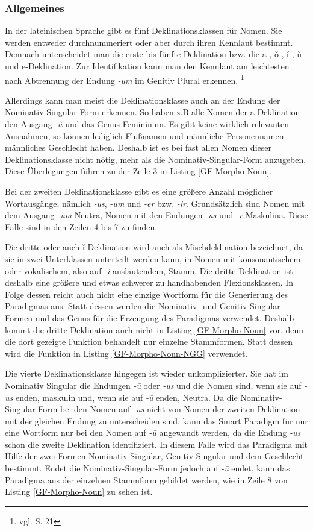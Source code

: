 \subsubsection{Allgemeines}
In der lateinischen Sprache gibt es fünf Deklinationsklassen für Nomen. Sie werden entweder durchnummeriert oder aber durch ihren Kennlaut bestimmt. Demnach unterscheidet man die erste bis fünfte Deklination bzw. die ā-, ǒ-, ǐ-, ǔ- und ē-Deklination. Zur Identifikation kann man den Kennlaut am leichtesten nach Abtrennung der Endung \textit{-um} im Genitiv Plural erkennen. \footnote{vgl. \cite{BAYER-LINDAUER1994} S. 21}\par
Allerdings kann man meist die Deklinationsklasse auch an der Endung der Nominativ-Singular-Form erkennen. So haben z.B alle Nomen der ā-Deklination den Ausgang \textit{-ǎ} und das Genus Femininum. Es gibt keine wirklich relevanten Ausnahmen, so können lediglich Flußnamen und männliche Personennamen männliches Geschlecht haben. Deshalb ist es bei fast allen Nomen dieser Deklinationsklasse nicht nötig, mehr als die Nominativ-Singular-Form anzugeben. Diese Überlegungen führen zu der Zeile 3 in Listing \ref{GF-Morpho-Noun}.\par
Bei der zweiten Deklinationsklasse gibt es eine größere Anzahl möglicher Wortausgänge, nämlich \textit{-us}, \textit{-um} und \textit{-er} bzw. \textit{-ir}. Grundsätzlich sind Nomen mit dem Ausgang \textit{-um} Neutra, Nomen mit den Endungen \textit{-us} und \textit{-r} Maskulina. Diese Fälle sind in den Zeilen 4 bis 7 zu finden. \par
Die dritte oder auch ǐ-Deklination wird auch als Mischdeklination bezeichnet, da sie in zwei Unterklassen unterteilt werden kann, in Nomen mit konsonantischem oder vokalischem, also auf \textit{-ǐ} auslautendem, Stamm. Die dritte Deklination ist deshalb eine größere und etwas schwerer zu handhabenden Flexionsklassen. In Folge dessen reicht auch nicht eine einzige Wortform für die Generierung des Paradigmas aus. Statt dessen werden die Nominativ- und Genitiv-Singular-Formen und das Genus für die Erzeugung des Paradigmas verwendet. Deshalb kommt die dritte Deklination auch nicht in Listing \ref{GF-Morpho-Noun} vor, denn die dort gezeigte Funktion behandelt nur einzelne Stammformen. Statt dessen wird die Funktion in Listing \ref{GF-Morpho-Noun-NGG} verwendet.\par
Die vierte Deklinationsklasse hingegen ist wieder unkomplizierter. Sie hat im Nominativ Singular die Endungen \textit{-ū} oder \textit{-us} und die Nomen sind, wenn sie auf \textit{-us} enden, maskulin und, wenn sie auf \textit{-ū} enden, Neutra. Da die Nominativ-Singular-Form bei den Nomen auf \textit{-us} nicht von Nomen der zweiten Deklination mit der gleichen Endung zu unterscheiden sind, kann das Smart Paradigm für nur eine Wortform nur bei den Nomen auf \textit{-ū} angewandt werden, da die Endung \textit{-us} schon die zweite Deklination identifiziert. In diesem Falle wird das Paradigma mit Hilfe der zwei Formen Nominativ Singular, Genitiv Singular und dem Geschlecht bestimmt. Endet die Nominativ-Singular-Form jedoch auf \textit{-ū} endet, kann das Paradigma aus der einzelnen Stammform gebildet werden, wie in Zeile 8 von Listing \ref{GF-Morpho-Noun} zu sehen ist. \par

